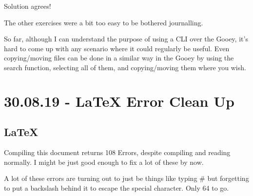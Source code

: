 \documentclass[12pt]{article}
\begin{document}
Solution agrees!

The other exercises were a bit too easy to be bothered journalling.

So far, although I can understand the purpose of using a CLI over the Gooey, it's hard to come up with any scenario where it could regularly be useful. Even copying/moving files can be done in a similar way in the Gooey by using the search function, selecting all of them, and copying/moving them where you wish.

\newpage\section{30.08.19 - LaTeX Error Clean Up}
\subsection{LaTeX}

Compiling this document returns 108 Errors, despite compiling and reading normally. I might be just good enough to fix a lot of these by now.

A lot of these errors are turning out to just be things like typing \# but forgetting to put a backslash behind it to escape the special character. Only 64 to go.
\end{document}
